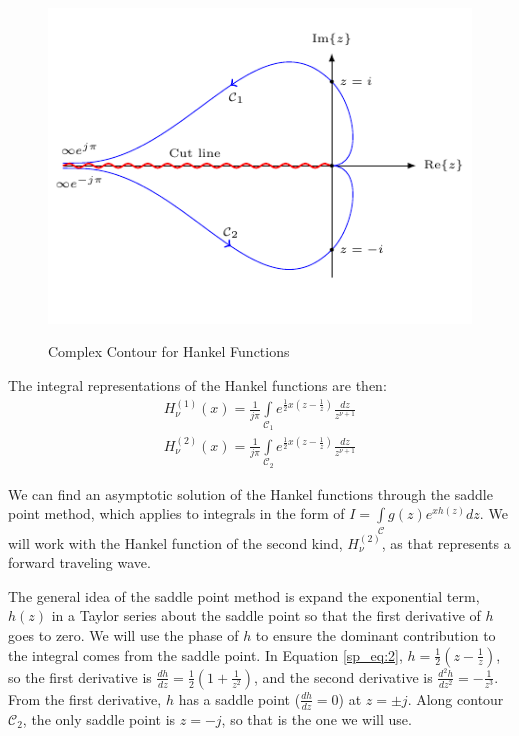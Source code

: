 \begin{figure}[H]
  \begin{center}
\includegraphics[width=5in]{../media/hankel_contours-figure1.pdf}
\end{center}
  \renewcommand{\baselinestretch}{1}\small\normalsize
  \begin{quote}
    \caption[Complex Contour for Hankel Functions]{Complex Contour for Hankel Functions\label{sp_fig:2}}
  \end{quote}
\end{figure}
\renewcommand{\baselinestretch}{2} \small\normalsize

The integral representations of the Hankel functions are then:
\begin{equation}
  \begin{gathered}
    H_{\nu}^{(1)}(x) = \frac{1}{j\pi}\int\limits_{\mathcal{C}_1}e^{\frac{1}{2}x\left(z- \frac{1}{z} \right)} \frac{dz}{z^{\nu+1}} \\
    H_{\nu}^{(2)}(x) = \frac{1}{j\pi}\int\limits_{\mathcal{C}_2}e^{\frac{1}{2}x\left(z- \frac{1}{z} \right)} \frac{dz}{z^{\nu+1}} 
    \end{gathered}
  \label{sp_eq:2}
  \end{equation}
\renewcommand{\baselinestretch}{2} \small\normalsize

We can find an asymptotic solution of the Hankel functions through the saddle point method, which applies to integrals in the form of $I = \int\limits_{\mathcal{C}}g(z)e^{xh(z)}dz$. We will work with the Hankel function of the second kind, $H_{\nu}^{(2)}$, as that represents a forward traveling wave.

The general idea of the saddle point method is expand the exponential term, $h(z)$ in a Taylor series about the saddle point so that the first derivative of $h$ goes to zero. We will use the phase of $h$ to ensure the dominant contribution to the integral comes from the saddle point. In Equation \ref{sp_eq:2}, $h = \frac{1}{2}\left(z-\frac{1}{z}\right)$, so the first derivative is $\frac{dh}{dz} = \frac{1}{2}\left(1+\frac{1}{z^2}\right)$, and the second derivative is $\frac{d^2h}{dz^2} = -\frac{1}{z^3}$. From the first derivative, $h$ has a saddle point ($\frac{dh}{dz}=0$) at $z=\pm j$. Along contour $\mathcal{C}_2$, the only saddle point is $z=-j$, so that is the one we will use.

